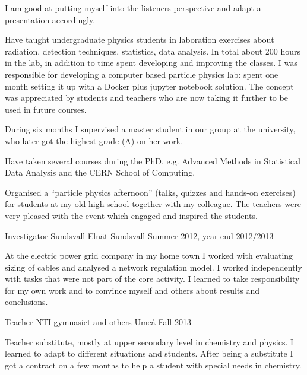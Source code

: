 \begin{cventries}
{\begin{cvitems}
{	I am good at putting myself into the listeners perspective and adapt a presentation accordingly.
}
\item {Have taught undergraduate physics students in laboration exercises about radiation, detection techniques, statistics, data analysis. 
       In total about 200 hours in the lab, in addition to time spent developing and improving the classes.
       I was responsible for developing a computer based particle physics lab: spent one month setting it up with a Docker plus jupyter notebook solution.
       The concept was appreciated by students and teachers who are now taking it further to be used in future courses.
}
\item {During six months I supervised a master student in our group at the university, who later got the highest grade (A) on her work.
}
\item {Have taken several courses during the PhD, e.g. Advanced Methods in Statistical Data Analysis and the CERN School of Computing.
}
\item {Organised a ``particle physics afternoon'' (talks, quizzes and hands-on exercises) for students at my old high school together with my colleague.
         The teachers were very pleased with the event which engaged and inspired the students.
}
\end{cvitems}
}



\cventry
{Investigator} %
{Sundsvall Eln\"{a}t} %
{Sundsvall} %
{Summer 2012, year-end 2012/2013} %
{ %
\begin{cvitems}
\item {At the electric power grid company in my home town I worked with evaluating sizing of cables and analysed a network regulation model. 
		 I worked independently with tasks that were not part of the core activity. 
		 I learned to take responsibility for my own work and to convince myself and others about results and conclusions. 
}
\end{cvitems}
}


\cventry
{Teacher} %
{NTI-gymnasiet and others} %
{Ume{\aa}} %
{Fall 2013} %
{ %
\begin{cvitems}
\item {Teacher substitute, mostly at upper secondary level in chemistry and physics. 
		I learned to adapt to different situations and students. 
		After being a substitute I got a contract on a few months to help a student with special needs in chemistry.
		 }
\end{cvitems}
}


\end{cventries}

